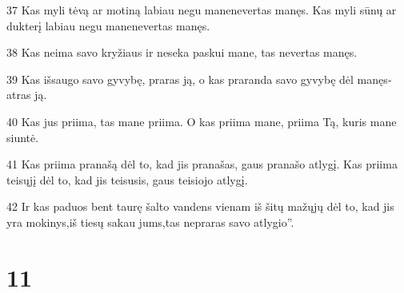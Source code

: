 \par 37 Kas myli tėvą ar motiną labiau negu mane­nevertas manęs. Kas myli sūnų ar dukterį labiau negu mane­nevertas manęs. 
\par 38 Kas neima savo kryžiaus ir neseka paskui mane, tas nevertas manęs. 
\par 39 Kas išsaugo savo gyvybę, praras ją, o kas praranda savo gyvybę dėl manęs­atras ją. 
\par 40 Kas jus priima, tas mane priima. O kas priima mane, priima Tą, kuris mane siuntė. 
\par 41 Kas priima pranašą dėl to, kad jis pranašas, gaus pranašo atlygį. Kas priima teisųjį dėl to, kad jis teisusis, gaus teisiojo atlygį. 
\par 42 Ir kas paduos bent taurę šalto vandens vienam iš šitų mažųjų dėl to, kad jis yra mokinys,­iš tiesų sakau jums,­tas nepraras savo atlygio”.



\chapter{11}


